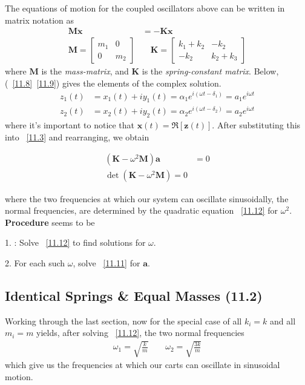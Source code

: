 \documentclass[10pt, twocolumn]{article}
\DeclareRobustCommand{\mybox}[2][gray!20]{%
	\begin{tcolorbox}[   %
		breakable,
		left=0pt,
		right=0pt,
		top=-13pt,
		bottom=0pt,
		colback=#1,
		colframe=#1,
		width=0.45\dimexpr\textwidth\relax,
		enlarge left by=0mm,
		boxsep=1pt,
		arc=0pt,outer arc=0pt,
		]
		#2
	\end{tcolorbox}
}
\newcommand\graybox[1]{ \mybox[gray!20]{\begin{align}#1\end{align}} }
\newcommand{\myspace}{\vspace{3\bigskipamount}}
\newcommand\p{\Needspace{10\baselineskip} \noindent}
\newcommand\tlab[1]{\tag{#1}\label{#1}}
\begin{document}
The equations of motion for the coupled oscillators above can be written in matrix notation as
\begin{align}
\mathbf M \ddot{\bm x} &= - \mathbf K \bm{x} \tlab{11.3} \\
\mathbf{M} = \begin{bmatrix} m_1 & 0 \\ 0 & m_2 \end{bmatrix} 
	&\quad 
	\mathbf{K} = \begin{bmatrix} k_1 + k_2 & -k_2 \\ -k_2 & k_2 + k_3 \end{bmatrix}\tlab{11.5}
\end{align}
where $\mathbf{M}$ is the \textit{mass-matrix}, and $\mathbf K$ is the \textit{spring-constant matrix}. Below, (~\ref{11.8}~\ref{11.9}) gives the elements of the complex solution.
\begin{align}
z_1(t) &= x_1(t) + i y_1(t) = \alpha_1 e^{i(\omega t - \delta_1)} = a_1 e^{i \omega t} \tlab{11.8} \\
z_2(t) &= x_2(t) + i y_2(t) = \alpha_2 e^{i(\omega t - \delta_2)} = a_2 e^{i \omega t} \tlab{11.9}
\end{align}
where it's important to notice that $\bm{x}(t) = \Re[\bm{z}(t)]$. After substituting this into ~\ref{11.3} and rearranging, we obtain
\graybox{
	(\mathbf K - \omega^2 \mathbf M)\bm{a} &= 0 \tlab{11.11} \\
	\det(\mathbf K - \omega^2 \mathbf M) = 0\tlab{11.12} }
\noindent where the two frequencies at which our system can oscillate sinusoidally, the normal frequencies, are determined by the quadratic equation ~\ref{11.12} for $\omega^2$. \\

\p \textbf{Procedure} seems to be
\begin{compactitem}
	\item[1.] : Solve ~\ref{11.12} to find solutions for $\omega$. 
	\item[2.]  For each such $\omega$, solve ~\ref{11.11} for $\bm a$. 
\end{compactitem}


\myspace
{}
\subsection{ Identical Springs \& Equal Masses (11.2) }
Working through the last section, now for the special case of all $k_i = k$ and all $m_i = m$ yields, after solving ~\ref{11.12}, the two normal frequencies
\begin{align}
\omega_1 = \sqrt{\frac{k}{m}} \qquad \omega_2 = \sqrt{\frac{3k}{m}} \tlab{11.15}
\end{align}
which give us the frequencies at which our carts can oscillate in sinusoidal motion.
\end{document}
